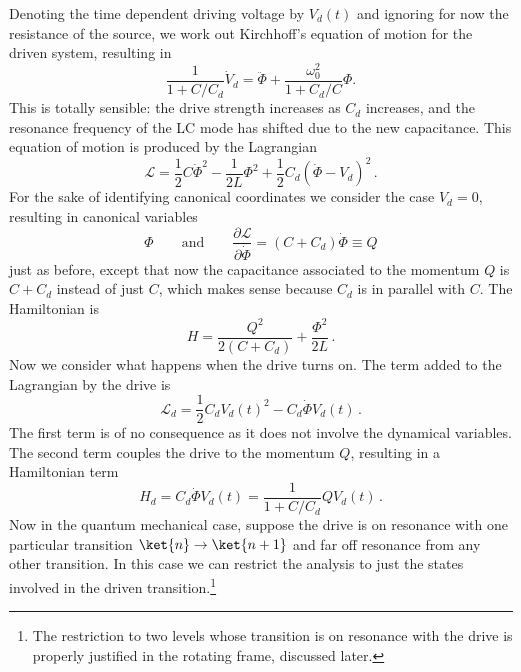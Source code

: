 Denoting the time dependent driving voltage by $V_d(t)$ and ignoring for now the resistance of the source, we work out Kirchhoff's equation of motion for the driven system, resulting in
\begin{equation}
\frac{1}{1+C/C_d} \dot{V}_d = \ddot{\Phi} + \frac{\omega_0^2}{1 + C_d/C} \Phi. \end{equation}
This is totally sensible: the drive strength increases as $C_d$ increases, and the resonance frequency of the LC mode has shifted due to the new capacitance.
This equation of motion is produced by the Lagrangian
\begin{equation}
\mathcal{L} = \frac{1}{2}C \dot{\Phi}^2 - \frac{1}{2L}\Phi^2 + \frac{1}{2} C_d \left( \dot{\Phi} - V_d \right)^2 \, .
\end{equation}
For the sake of identifying canonical coordinates we consider the case $V_d=0$, resulting in canonical variables
\begin{equation*}
  \Phi
  \qquad \textrm{and} \qquad
  \frac{\partial \mathcal{L}}{\partial \dot{\Phi}} = \left( C + C_d \right) \dot{\Phi} \equiv Q
\end{equation*}
just as before, except that now the capacitance associated to the momentum $Q$ is $C+C_d$ instead of just $C$, which makes sense because $C_d$ is in parallel with $C$.
The Hamiltonian is
\begin{equation*}
  H = \frac{Q^2}{2 (C + C_d)} + \frac{\Phi^2}{2L} \, .
\end{equation*}
Now we consider what happens when the drive turns on.
The term added to the Lagrangian by the drive is
\begin{equation*}
  \mathcal{L}_d = \frac{1}{2}C_d V_d(t)^2 - C_d \dot{\Phi} V_d(t) \, .
\end{equation*}
The first term is of no consequence as it does not involve the dynamical variables.
The second term couples the drive to the momentum $Q$, resulting in a Hamiltonian term
\begin{equation*}
H_d
  = C_d \dot{\Phi}V_d(t)
  = \frac{1}{1+C/C_d} Q V_d(t) \, . \label{eq:sec:driving:H_dVsCircuitParams}
\end{equation*}
Now in the quantum mechanical case, suppose the drive is on resonance with one particular transition $\ket{n} \rightarrow \ket{n+1}$ and far off resonance from any other transition.
In this case we can restrict the analysis to just the states involved in the driven transition.\footnote{The restriction to two levels whose transition is on resonance with the drive is properly justified in the rotating frame, discussed later.}
